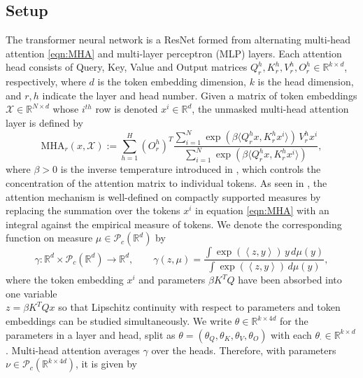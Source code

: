 \documentclass{article}
\newcommand{\R}{\mathbb{R}}
\begin{document}
\subsection{Setup}
 The transformer neural network \cite{NIPS2017_3f5ee243} is a ResNet formed from alternating multi-head attention \eqref{eqn:MHA} and multi-layer perceptron (MLP) layers. Each attention head consists of Query, Key, Value and Output matrices $Q_r^h,K_r^h,V_r^h,O_r^h\in \mathbb R^{k \times d}$, respectively, where $d$ is the token embedding dimension, $k$ is the head dimension, and $r,h$ indicate the layer and head number. Given a matrix of token embeddings $\mathcal X\in \R^{N\times d}$ whose $i^{th}$ row is denoted $x^i\in \mathbb R^d$, the unmasked multi-head attention layer is defined by
\begin{equation}\label{eqn:MHA}
    \mathrm{MHA}_{r}(x,\mathcal X) :=   \sum_{h=1}^H (O^h_r)^T\frac{\sum_{i=1}^N \exp(\beta\langle Q_r^hx, K_r^hx^{i}\rangle )\, V_r^hx^i}{\sum_{i=1}^N \exp(\beta\langle Q_r^hx,K_r^hx^{i}\rangle)},
\end{equation}
where $\beta > 0$ is the inverse temperature introduced in \cite{geshkovski2025mathematicalperspectivetransformers}, which controls the concentration of the attention matrix to individual tokens.
As seen in \cite{geshkovski2024emergenceclustersselfattentiondynamics,furuya2024transformersuniversalincontextlearners,geshkovski2025mathematicalperspectivetransformers,rigollet2025meanfielddynamicstransformers,sander2022sinkformerstransformersdoublystochastic}, the attention mechanism is well-defined on compactly supported measures by replacing the summation over the tokens $x^i$ in equation \eqref{eqn:MHA} with an integral against the empirical measure of tokens. We denote the corresponding function on measure $\mu \in \mathcal P_c(\R^d)$ by
\begin{equation}\label{eqn:gamma}
\gamma : \R^d\times \mathcal P_c(\R^d)\to \R^d, \qquad
    \gamma(z,\mu) = \frac{\int \exp( \left\langle z,  y \right\rangle)\,y\,d\mu(y)}{\int \exp( \left\langle z, y \right\rangle)\,d\mu(y)},
\end{equation}
where the token embedding $x^i$ and parameters $\beta K^TQ$ have been absorbed into one variable \\$z=\beta K^TQx$ so that Lipschitz continuity with respect to parameters and token embeddings can be studied simultaneously. We write $\theta\in \R^{k\times 4d}$ for the parameters in a layer and head, split as $\theta = (\theta_Q,\theta_K,\theta_V,\theta_O)$ with each $\theta_\cdot\in\R^{k\times d}$.  Multi-head attention averages $\gamma$ over the heads. Therefore, with parameters $\nu\in \mathcal P_c(\R^{k\times 4d})$, it is given by
\end{document}
